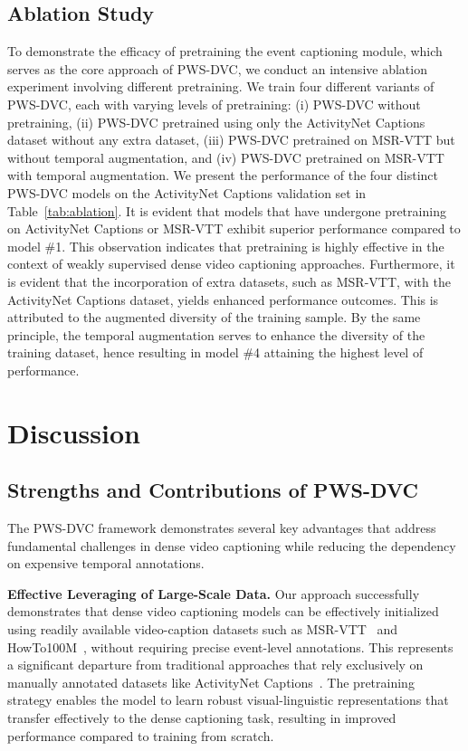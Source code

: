 \subsection{Ablation Study}
To demonstrate the efficacy of pretraining the event captioning module, which serves as the core approach of PWS-DVC, we conduct an intensive ablation experiment involving different pretraining.
We train four different variants of PWS-DVC, each with varying levels of pretraining: (i) PWS-DVC without pretraining, (ii) PWS-DVC pretrained using only the ActivityNet Captions dataset without any extra dataset, (iii) PWS-DVC pretrained on MSR-VTT but without temporal augmentation, and (iv) PWS-DVC pretrained on MSR-VTT with temporal augmentation.
We present the performance of the four distinct PWS-DVC models on the ActivityNet Captions validation set in Table~\ref{tab:ablation}.
It is evident that models that have undergone pretraining on ActivityNet Captions or MSR-VTT exhibit superior performance compared to model \#1.
This observation indicates that pretraining is highly effective in the context of weakly supervised dense video captioning approaches.
Furthermore, it is evident that the incorporation of extra datasets, such as MSR-VTT, with the ActivityNet Captions dataset, yields enhanced performance outcomes.
This is attributed to the augmented diversity of the training sample.
By the same principle, the temporal augmentation serves to enhance the diversity of the training dataset, hence resulting in model \#4 attaining the highest level of performance.



\section{Discussion}
\label{sec:discussion}

\subsection{Strengths and Contributions of PWS-DVC}

The PWS-DVC framework demonstrates several key advantages that address fundamental challenges in dense video captioning while reducing the dependency on expensive temporal annotations.

\textbf{Effective Leveraging of Large-Scale Data.}
Our approach successfully demonstrates that dense video captioning models can be effectively initialized using readily available video-caption datasets such as MSR-VTT~\cite{Xu2016-ti} and HowTo100M~\cite{Miech2019-hk}, without requiring precise event-level annotations.
This represents a significant departure from traditional approaches that rely exclusively on manually annotated datasets like ActivityNet Captions~\cite{Krishna2017-pw}. The pretraining strategy enables the model to learn robust visual-linguistic representations that transfer effectively to the dense captioning task, resulting in improved performance compared to training from scratch.

